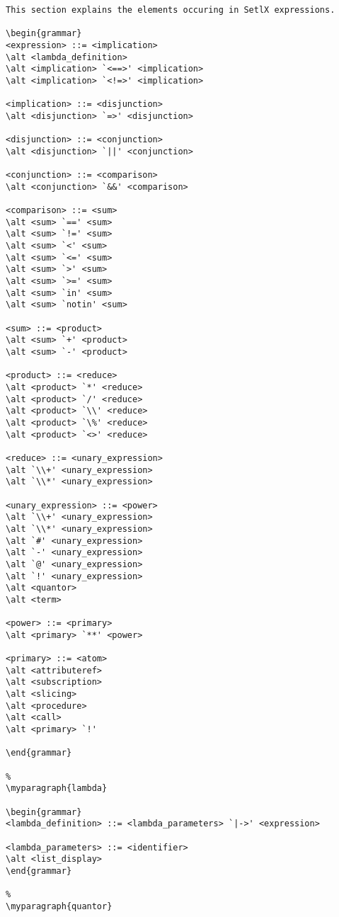 \begin{verbatim}
This section explains the elements occuring in SetlX expressions.

\begin{grammar}
<expression> ::= <implication>
\alt <lambda_definition>
\alt <implication> `<==>' <implication>
\alt <implication> `<!=>' <implication>

<implication> ::= <disjunction>
\alt <disjunction> `=>' <disjunction>

<disjunction> ::= <conjunction>
\alt <disjunction> `||' <conjunction>

<conjunction> ::= <comparison>
\alt <conjunction> `&&' <comparison>

<comparison> ::= <sum>
\alt <sum> `==' <sum>
\alt <sum> `!=' <sum>
\alt <sum> `<' <sum>
\alt <sum> `<=' <sum>
\alt <sum> `>' <sum>
\alt <sum> `>=' <sum>
\alt <sum> `in' <sum>
\alt <sum> `notin' <sum>

<sum> ::= <product>
\alt <sum> `+' <product>
\alt <sum> `-' <product>

<product> ::= <reduce>
\alt <product> `*' <reduce>
\alt <product> `/' <reduce>
\alt <product> `\\' <reduce>
\alt <product> `\%' <reduce>
\alt <product> `<>' <reduce>

<reduce> ::= <unary_expression>
\alt `\\+' <unary_expression>
\alt `\\*' <unary_expression>

<unary_expression> ::= <power>
\alt `\\+' <unary_expression>
\alt `\\*' <unary_expression>
\alt `#' <unary_expression>
\alt `-' <unary_expression>
\alt `@' <unary_expression>
\alt `!' <unary_expression>
\alt <quantor>
\alt <term>

<power> ::= <primary>
\alt <primary> `**' <power>

<primary> ::= <atom>
\alt <attributeref>
\alt <subscription>
\alt <slicing>
\alt <procedure>
\alt <call>
\alt <primary> `!'

\end{grammar}

%
\myparagraph{lambda}

\begin{grammar}
<lambda_definition> ::= <lambda_parameters> `|->' <expression>

<lambda_parameters> ::= <identifier>
\alt <list_display>
\end{grammar}

%
\myparagraph{quantor}


\end{verbatim}
